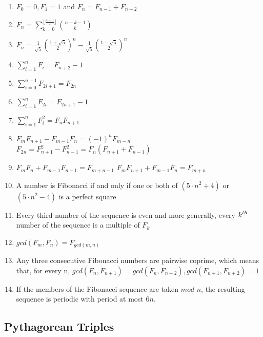 \begin{enumerate}[resume]
    \item $\displaystyle F_0=0, F_1=1$ and $\displaystyle F_n=F_{n-1}+F_{n-2}$
    \item $\displaystyle F_n=\sum\limits_{k=0}^{\lfloor\frac{n-1}{2}\rfloor}\binom{n-k-1}{k}$
    \item $\displaystyle F_n=\frac{1}{\sqrt{5}}(\frac{1+\sqrt{5}}{2})^n-\frac{1}{\sqrt{5}}(\frac{1-\sqrt{5}}{2})^n$
    \item $\displaystyle \sum\limits_{i=1}^{n}F_i=F_{n+2}-1$
    \item $\displaystyle \sum\limits_{i=0}^{n-1}F_{2i+1}=F_{2n}$
    \item $\displaystyle \sum\limits_{i=1}^{n}F_{2i}=F_{2n+1}-1$
    \item $\displaystyle \sum\limits_{i=1}^{n}F_{i}^{2}=F_nF_{n+1}$
    \item $\displaystyle F_mF_{n+1}-F_{m-1}F_{n}=(-1)^nF_{m-n}$
          $\displaystyle F_{2n}=F_{n+1}^2-F_{n-1}^2=F_n(F_{n+1}+F_{n-1})$
    \item $\displaystyle F_mF_n+F_{m-1}F_{n-1}=F_{m+n-1}$
          $\displaystyle F_mF_{n+1}+F_{m-1}F_{n}=F_{m+n}$
    \item A number is Fibonacci if and only if one or both of $\displaystyle (5 \cdot n^2 + 4)$ or $\displaystyle (5 \cdot n^2 - 4)$ is a perfect square
    \item Every third number of the sequence is even and more generally, every $\displaystyle \displaystyle k^{th}$ number of the sequence is a multiple of $\displaystyle F_k$
    \item $gcd(F_m, F_n)=F_{gcd(m, n)}$
    \item Any three consecutive Fibonacci numbers are pairwise coprime, which means that, for every n, $gcd(F_n, F_{n+1})=gcd(F_n, F_{n+2}), gcd(F_{n+1}, F_{n+2})=1$
    \item If the members of the Fibonacci sequence are taken $mod$ $n$, the resulting sequence is periodic with period at most $6n$.
\end{enumerate}

\subsection{Pythagorean Triples}

